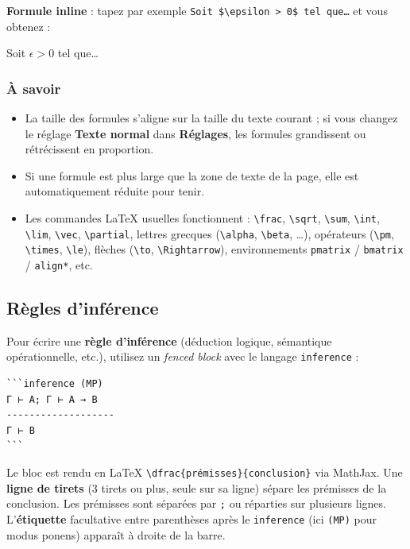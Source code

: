 \documentclass[11pt,a4paper]{article}
\theoremstyle{definition}
\begin{document}
\textbf{Formule inline} : tapez par exemple
\texttt{Soit \$\textbackslash{}epsilon > 0\$ tel que…} et vous obtenez :


Soit $\epsilon > 0$ tel que…


\subsubsection{À savoir}

\begin{itemize}
  \item La taille des formules s'aligne sur la taille du texte courant ; si
vous changez le réglage \textbf{Texte normal} dans \textbf{Réglages}, les
formules grandissent ou rétrécissent en proportion.
  \item Si une formule est plus large que la zone de texte de la page, elle
est automatiquement réduite pour tenir.
  \item Les commandes LaTeX usuelles fonctionnent : \texttt{\textbackslash{}frac}, \texttt{\textbackslash{}sqrt},
\texttt{\textbackslash{}sum}, \texttt{\textbackslash{}int}, \texttt{\textbackslash{}lim}, \texttt{\textbackslash{}vec}, \texttt{\textbackslash{}partial}, lettres grecques
(\texttt{\textbackslash{}alpha}, \texttt{\textbackslash{}beta}, …), opérateurs (\texttt{\textbackslash{}pm}, \texttt{\textbackslash{}times}, \texttt{\textbackslash{}le}),
flèches (\texttt{\textbackslash{}to}, \texttt{\textbackslash{}Rightarrow}), environnements \texttt{pmatrix} /
\texttt{bmatrix} / \texttt{align*}, etc.
\end{itemize}


\subsection{Règles d'inférence}

Pour écrire une \textbf{règle d'inférence} (déduction logique, sémantique
opérationnelle, etc.), utilisez un \emph{fenced block} avec le langage
\texttt{inference} :


\begin{lstlisting}
```inference (MP)
Γ ⊢ A; Γ ⊢ A → B
-------------------
Γ ⊢ B
```
\end{lstlisting}


Le bloc est rendu en LaTeX \texttt{\textbackslash{}dfrac\{prémisses\}\{conclusion\}} via
MathJax. Une \textbf{ligne de tirets} (3 tirets ou plus, seule sur sa
ligne) sépare les prémisses de la conclusion. Les prémisses sont
séparées par \texttt{;} ou réparties sur plusieurs lignes. L'\textbf{étiquette}
facultative entre parenthèses après le \texttt{inference} (ici \texttt{(MP)} pour
modus ponens) apparaît à droite de la barre.
\end{document}
